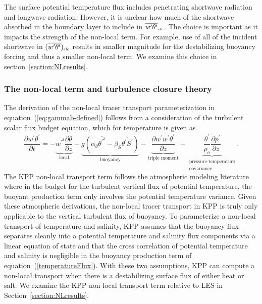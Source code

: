 \documentclass[preprint,12pt,authoryear]{agujournal}
\begin{document}
The surface potential temperature flux includes penetrating shortwave radiation and longwave radiation. However, it is unclear how much of the shortwave absorbed in the boundary layer to include in $\overline{w^\prime \theta^\prime}_{\mbox{\tiny sfc}}$. The choice is  important as it impacts the strength of the non-local term. For example, use of all of the incident shortwave in $(\overline{w^\prime \theta^\prime})_{\mbox{\tiny sfc}}$ results in smaller magnitude for the destabilizing buoyancy forcing and thus a smaller non-local term.  We examine this choice in section~\ref{section:NLresults}.

\subsubsection{The non-local term and turbulence closure theory}

The derivation of the non-local tracer transport parameterization in equation~(\ref{eq:gammab-defined}) follows from a consideration of the turbulent scalar flux budget equation, which for temperature is given as
\begin{equation}
\label{temperatureFlux}
\frac{\partial \overline{w^\prime \theta^\prime}}{\partial t} =  -\underbrace{\overline{w^{\prime^2}} \frac{\partial \overline{\theta}}{\partial z}}_\textrm{local} + \underbrace{g \left(\alpha_\theta \overline{\theta^{\prime^2}} - \beta_S \overline{\theta^\prime S^{\prime}}\right)}_\textrm{buoyancy} - \underbrace{\frac{\partial \overline{w^\prime w^\prime \theta^\prime}}{\partial z}}_\textrm{triple moment} - \underbrace{\overline{\frac{\theta^\prime}{\rho_o}\frac{\partial p^\prime}{\partial z}}}_{\substack{\textrm{pressure-temperature}\\
\textrm{covariance}}}.
\end{equation}
The KPP non-local transport term follows the atmospheric modeling literature \citep{ertel1942vertical,Deardorff1966,Deardorff:1972,Mailhot1982,Holtslag1991} where in the budget for the turbulent vertical flux of potential temperature, the buoyant production term only involves the potential temperature variance.  Given these atmospheric derivations, the non-local tracer transport in KPP is truly only applicable to the vertical turbulent flux of buoyancy.  To parameterize a non-local transport of temperature and salinity, KPP assumes that the buoyancy flux separates cleanly into a potential temperature and salinity flux components via a linear equation of state and that the cross correlation of potential temperature and salinity is negligible in the buoyancy production term of equation~(\ref{temperatureFlux}). With these two assumptions, KPP can compute a non-local transport when there is a destabilizing surface flux of either heat or salt. We examine the KPP non-local transport term relative to LES in Section~\ref{section:NLresults}.
\end{document}
